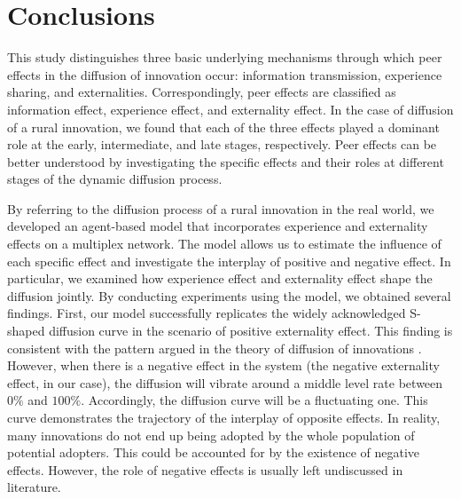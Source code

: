 \documentclass{bmcart}
\begin{document}
\section*{Conclusions}
This study distinguishes three basic underlying mechanisms through which peer effects in the diffusion of innovation occur: information transmission, experience sharing, and externalities. Correspondingly, peer effects are classified as information effect, experience effect, and externality effect. In the case of diffusion of a rural innovation, we found that each of the three effects played a dominant role at the early, intermediate, and late stages, respectively. Peer effects can be better understood by investigating the specific effects and their roles at different stages of the dynamic diffusion process.

By referring to the diffusion process of a rural innovation in the real world, we developed an agent-based model that incorporates experience and externality effects on a multiplex network. The model allows us to estimate the influence of each specific effect and investigate the interplay of positive and negative effect. In particular, we examined how experience effect and externality effect shape the diffusion jointly. By conducting experiments using the model, we obtained several findings. First, our model successfully replicates the widely acknowledged S-shaped diffusion curve in the scenario of positive externality effect. This finding is consistent with the pattern argued in the theory of diffusion of innovations \cite{Rogers2003}. However, when there is a negative effect in the system (the negative externality effect, in our case), the diffusion will vibrate around a middle level rate between $0\%$ and $100\%$. Accordingly, the diffusion curve will be a fluctuating one. This curve demonstrates the trajectory of the interplay of opposite effects. In reality, many innovations do not end up being adopted by the whole population of potential adopters. This could be accounted for by the existence of negative effects. However, the role of negative effects is usually left undiscussed in literature.
\end{document}

